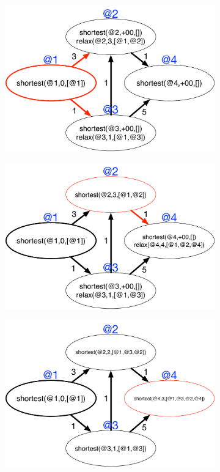 \begin{figure}
\begin{center}
   \begin{subfigure}[b]{0.4\textwidth}
      \includegraphics[width=\textwidth]{figures/sssp/shortest2}
      \caption{}
   \end{subfigure}
   \begin{subfigure}[b]{0.4\textwidth}
      \includegraphics[width=\textwidth]{figures/sssp/shortest3}
      \caption{}
   \end{subfigure}
   \begin{subfigure}[b]{0.4\textwidth}
      \includegraphics[width=\textwidth]{figures/sssp/shortest8}

\end{subfigure}
\end{center}
\end{figure}
